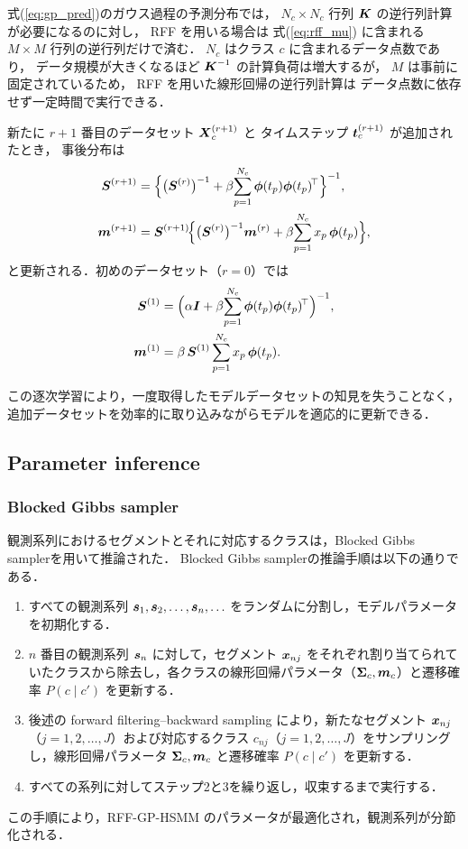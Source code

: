 \documentclass[conference]{IEEEtran}
\begin{document}
式(\ref{eq:gp_pred})のガウス過程の予測分布では，
$N_c\times N_c$ 行列 ${ \boldsymbol K}$ の逆行列計算が必要になるのに対し，
RFF を用いる場合は
式(\ref{eq:rff_mu}) に含まれる
$M\times M$ 行列の逆行列だけで済む．
$N_c$ はクラス $c$ に含まれるデータ点数であり，
データ規模が大きくなるほど ${ \boldsymbol K}^{-1}$ の計算負荷は増大するが，
$M$ は事前に固定されているため，
RFF を用いた線形回帰の逆行列計算は
データ点数に依存せず一定時間で実行できる．

新たに $r\!+\!1$ 番目のデータセット  
${ \boldsymbol X}_c^{(r+1)}$ と
タイムステップ ${ \boldsymbol t}_c^{(r+1)}$ が追加されたとき，
事後分布は
\begin{align}
  \bS^{(r+1)}
    &=\Bigl\{\bigl(\bS^{(r)}\bigr)^{-1}
              +\beta\!\sum_{p=1}^{N_c}
                \bphi(t_p)\bphi(t_p)^{\!\top}\Bigr\}^{-1},
        \label{eq:inc_S}\\
  \bm^{(r+1)}
    &=\bS^{(r+1)}\!
      \Bigl\{\bigl(\bS^{(r)}\bigr)^{-1}\bm^{(r)}
               +\beta\!\sum_{p=1}^{N_c}
                 x_p\,\bphi(t_p)\Bigr\},
        \label{eq:inc_m}
\end{align}
と更新される．初めのデータセット（$r=0$）では
\begin{align}
  { \boldsymbol S}^{(1)}
    &= \Bigl(\alpha{ \boldsymbol I}
        + \beta\!\sum_{p=1}^{N_c}
          {\boldsymbol\phi}(t_p){\boldsymbol\phi}(t_p)^{\!\top}\Bigr)^{-1},\\
  { \boldsymbol m}^{(1)}
    &= \beta\,{ \boldsymbol S}^{(1)}
       \sum_{p=1}^{N_c} x_p\,{\boldsymbol\phi}(t_p).
\end{align}

この逐次学習\cite{Broderick2013}により，一度取得したモデルデータセットの知見を失うことなく，追加データセットを効率的に取り込みながらモデルを適応的に更新できる．

\subsection{Parameter inference}
\subsubsection{Blocked Gibbs sampler}
観測系列におけるセグメントとそれに対応するクラスは，Blocked Gibbs samplerを用いて推論された．  
Blocked Gibbs samplerの推論手順は以下の通りである．
%
\begin{enumerate}
 \item すべての観測系列 ${ \boldsymbol s}_1, { \boldsymbol s}_2, \ldots, { \boldsymbol s}_n, \ldots$ をランダムに分割し，モデルパラメータを初期化する．
 \item $n$ 番目の観測系列 ${ \boldsymbol s}_n$ に対して，セグメント ${ \boldsymbol x}_{nj}$ をそれぞれ割り当てられていたクラスから除去し，各クラスの線形回帰パラメータ（${\boldsymbol\Sigma}_c, { \boldsymbol m}_c$）と遷移確率 $P(c \mid c')$ を更新する．
 \item 後述の forward filtering–backward sampling により，新たなセグメント ${ \boldsymbol x}_{nj}$（$j = 1, 2, \dots, J$）および対応するクラス $c_{nj}$（$j = 1, 2, \dots, J$）をサンプリングし，線形回帰パラメータ ${\boldsymbol\Sigma}_c, { \boldsymbol m}_c$ と遷移確率 $P(c \mid c')$ を更新する．
 \item すべての系列に対してステップ2と3を繰り返し，収束するまで実行する．
\end{enumerate}
%
この手順により，RFF-GP-HSMM のパラメータが最適化され，観測系列が分節化される．
\end{document}
